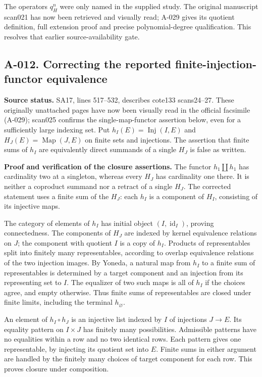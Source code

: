 \documentclass[11pt]{article}
\begin{document}
The operators $q_H^n$ were only named in the supplied study.
The original manuscript scan021 has now been retrieved and visually
read; A-029 gives its quotient definition, full extension proof and
precise polynomial-degree qualification. This resolves that earlier
source-availability gate.

\subsection*{A-012. Correcting the reported finite-injection-functor equivalence}
\textbf{Source status.} SA17, lines 517--532, describes cote133
scans24--27. These originally unattached pages have now been
visually read in the official facsimile (A-029); scan025 confirms
the single-map-functor assertion below, even for a sufficiently
large indexing set. Put
$h_I(E)=\operatorname{Inj}(I,E)$ and $H_J(E)=\operatorname{Map}(J,E)$
on finite sets and injections. The assertion that finite sums of
$h_I$ are equivalently direct summands of a single $H_J$ is false
as written.

\textbf{Proof and verification of the closure assertions.}
The functor $h_1\amalg h_1$ has cardinality two at a singleton,
whereas every $H_J$ has cardinality one there. It is neither a
coproduct summand nor a retract of a single $H_J$. The corrected
statement uses a finite sum of the $H_J$: each $h_I$ is a component
of $H_I$, consisting of its injective maps.

The category of elements of $h_I$ has initial object
$(I,\operatorname{id}_I)$, proving connectedness. The components
of $H_J$ are indexed by kernel equivalence relations on $J$; the
component with quotient $I$ is a copy of $h_I$. Products of
representables split into finitely many representables, according
to overlap equivalence relations of the two injection images.
By Yoneda, a natural map from $h_I$ to a finite sum of representables
is determined by a target component and an injection from its
representing set to $I$. The equalizer of two such maps is all
of $h_I$ if the choices agree, and empty otherwise. Thus finite
sums of representables are closed under finite limits, including
the terminal $h_\varnothing$.

An element of $h_I\circ h_J$ is an injective list indexed by $I$
of injections $J\to E$. Its equality pattern on $I\times J$ has
finitely many possibilities. Admissible patterns have no equalities
within a row and no two identical rows. Each pattern gives one
representable, by injecting its quotient set into $E$. Finite sums
in either argument are handled by the finitely many choices of
target component for each row. This proves closure under composition.
\end{document}
